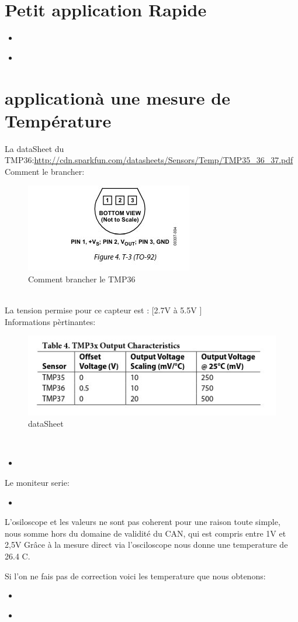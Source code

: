 \documentclass[10pt,a4paper]{article}
\newcommand{\insertcode}[2]{\begin{itemize}\item[]\end{itemize}}
\begin{document}
\section{Petit application Rapide}
\insertcode{code/angle.ino}{Ange}
\insertcode{code/serial.txt}{Sortie serie}


\section{applicationà une mesure de Température}
La dataSheet du TMP36:\url{http://cdn.sparkfun.com/datasheets/Sensors/Temp/TMP35_36_37.pdf}\\
Comment le brancher:\\ 
\begin{figure}[h!]
\centering
\includegraphics[scale=0.50]{image/4.jpg}
\caption{Comment brancher le TMP36}
\label{fig:net }
\end{figure}\\
La tension permise pour ce capteur est : [2.7V à 5.5V ]\\
Informations pèrtinantes:\\
\begin{figure}[h!]
\centering
\includegraphics[scale=0.50]{image/5.jpg}
\caption{dataSheet}
\label{fig:net }
\end{figure}\\
\insertcode{code/tmp.ino}{Code pour le capteur de temperature}
Le moniteur serie:
\insertcode{code/serial.tmp}{temperature}
L'osiloscope et les valeurs ne sont pas coherent pour une raison toute simple, nous somme hors du domaine de validité du CAN, qui est compris entre 1V et 2,5V 
Grâce à la mesure direct via l'osciloscope nous donne une temperature de 26.4 C. 

Si l'on ne fais pas de correction voici les temperature que nous obtenons:
\insertcode{code/tmpUNUSE.ino}{On ne fais pas la correction du CAN} 
\insertcode{code/serialUNUSE.tmp}{Une temperature de 5 degres que fais l'IUT ?}
\end{document}
